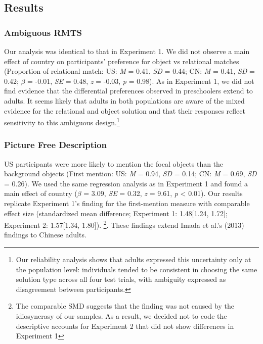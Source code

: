 \documentclass[
  man,floatsintext]{apa6}
\begin{document}
\hypertarget{results-1}{%
\subsection{Results}\label{results-1}}

\hypertarget{ambiguous-rmts}{%
\subsubsection{Ambiguous RMTS}\label{ambiguous-rmts}}

Our analysis was identical to that in Experiment 1. We did not observe a main effect of country on participants' preference for object vs relational matches (Proportion of relational match: US: \emph{M} = 0.41, \emph{SD} = 0.44; CN: \emph{M} = 0.41, \emph{SD} = 0.42; \(\beta\) = -0.01, \emph{SE} = 0.48, \emph{z} = -0.03, \emph{p} = 0.98). As in Experiment 1, we did not find evidence that the differential preferences observed in preschoolers extend to adults. It seems likely that adults in both populations are aware of the mixed evidence for the relational and object solution and that their responses reflect sensitivity to this ambiguous design.\footnote{Our reliability analysis shows that adults expressed this uncertainty only at the population level: individuals tended to be consistent in choosing the same solution type across all four test trials, with ambiguity expressed as disagreement between participants.}

\hypertarget{picture-free-description-1}{%
\subsubsection{Picture Free Description}\label{picture-free-description-1}}

US participants were more likely to mention the focal objects than the background objects (First mention: US: \emph{M} = 0.94, \emph{SD} = 0.14; CN: \emph{M} = 0.69, \emph{SD} = 0.26). We used the same regression analysis as in Experiment 1 and found a main effect of country (\(\beta\) = 3.09, \emph{SE} = 0.32, \emph{z} = 9.61, \emph{p} \textless{} 0.01). Our results replicate Experiment 1's finding for the first-mention measure with comparable effect size (standardized mean difference; Experiment 1: 1.48{[}1.24, 1.72{]}; Experiment 2: 1.57{[}1.34, 1.80{]}). \footnote{The comparable SMD suggests that the finding was not caused by the idiosyncrasy of our samples. As a result, we decided not to code the descriptive accounts for Experiment 2 that did not show differences in Experiment 1}. These findings extend Imada et al.'s (2013) findings to Chinese adults.
\end{document}
